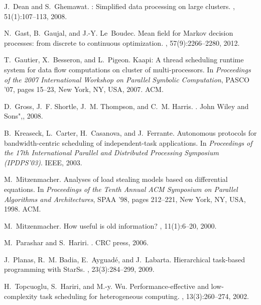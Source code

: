 \documentclass[a4paper,10pt]{article}
\begin{document}
\begin{thebibliography}{10}
J.~Dean and S.~Ghemawat.
: Simplified data processing on large clusters.
, 51(1):107--113, 2008.

N.~Gast, B.~Gaujal, and J.-Y. Le~Boudec.
\newblock Mean field for Markov decision processes: from discrete to continuous
  optimization.
, 57(9):2266--2280, 2012.

T.~Gautier, X.~Besseron, and L.~Pigeon.
\newblock Kaapi: A thread scheduling runtime system for data flow computations
  on cluster of multi-processors.
\newblock In {\em Proceedings of the 2007 International Workshop on Parallel
  Symbolic Computation}, PASCO '07, pages 15--23, New York, NY, USA, 2007. ACM.

D.~Gross, J.~F. Shortle, J.~M. Thompson, and C.~M. Harris.
.
\newblock John Wiley and Sons",, 2008.

B.~Kreaseck, L.~Carter, H.~Casanova, and J.~Ferrante.
\newblock Autonomous protocols for bandwidth-centric scheduling of
  independent-task applications.
\newblock In {\em Proceedings of the 17th International Parallel and
  Distributed Processing Symposium (IPDPS'03)}. IEEE, 2003.

M.~Mitzenmacher.
\newblock Analyses of load stealing models based on differential equations.
\newblock In {\em Proceedings of the Tenth Annual ACM Symposium on Parallel
  Algorithms and Architectures}, SPAA '98, pages 212--221, New York, NY, USA,
  1998. ACM.

M.~Mitzenmacher.
\newblock How useful is old information?
, 11(1):6--20, 2000.

M.~Parashar and S.~Hariri.
.
\newblock CRC press, 2006.

J.~Planas, R.~M. Badia, E.~Ayguad{\'e}, and J.~Labarta.
\newblock Hierarchical task-based programming with {StarSs}.
, 23(3):284--299, 2009.

H.~Topcuoglu, S.~Hariri, and M.-y. Wu.
\newblock Performance-effective and low-complexity task scheduling for
  heterogeneous computing.
,
  13(3):260--274, 2002.

\end{thebibliography}
\end{document}
